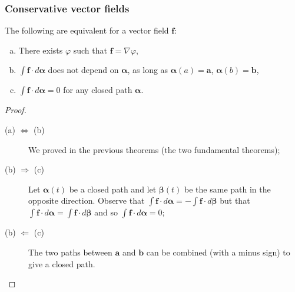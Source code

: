 \documentclass[aspectratio=169,handout]{beamer}
\renewcommand{\aa}{\mathbf{a}}
\newcommand{\bb}{\mathbf{b}}
\newcommand{\ff}{\mathbf{f}}
\newcommand{\aalpha}{\boldsymbol{\alpha}}
\newcommand{\bbeta}{\boldsymbol{\beta}}
\begin{document}
\begin{frame}
    \frametitle{Conservative vector fields}

    \begin{theorem}
        The following are equivalent for a vector field \(\ff\):
        \begin{enumerate}[(a)]
            \item There exists \(\varphi\) such that \(\ff = \nabla \varphi\),
            \item \(\int \ff \cdot d\aalpha\) does not depend on \(\aalpha\), as long as \(\aalpha(a)=\aa\), \(\aalpha(b)=\bb\),
            \item \(\int \ff \cdot d\aalpha = 0\) for any closed path \(\aalpha\).
        \end{enumerate}
    \end{theorem}

    \begin{proof}
        \begin{description}
            \item[(a) \(\Leftrightarrow\) (b)] We proved in the previous theorems (the two fundamental theorems);
            \item[(b) \(\Rightarrow\) (c)] Let \(\aalpha(t)\) be a closed path and let \(\bbeta(t)\) be the same path in the opposite direction. Observe that \(\int \ff \cdot d\aalpha = - \int \ff \cdot d \bbeta\) but that \(\int \ff \cdot d \aalpha = \int \ff \cdot d \bbeta\) and so \(\int \ff \cdot d \aalpha = 0\);
            \item[(b) \(\Leftarrow\) (c)] The two paths between \(\aa\) and \(\bb\) can be combined (with a minus sign) to give a closed path.
        \end{description}
    \end{proof}


\end{frame}
\end{document}
